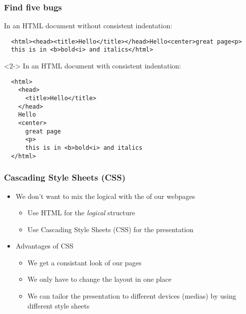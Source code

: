 \documentclass[dvipsnames,handout]{beamer}
\begin{document}
\begin{frame}[fragile]
\frametitle{Find five bugs}

In an HTML document without consistent indentation:
\begin{footnotesize}
\begin{verbatim}
  <html><head><title>Hello</title></head>Hello<center>great page<p>
  this is in <b>bold<i> and italics</html>
\end{verbatim}
\end{footnotesize}
\begin{uncoverenv}<2->
  In an HTML document with consistent indentation:
  \begin{footnotesize}
\begin{verbatim}
  <html>
    <head>
      <title>Hello</title>
    </head>
    Hello
    <center>
      great page
      <p>
      this is in <b>bold<i> and italics
  </html>
\end{verbatim}
   \end{footnotesize}
 \end{uncoverenv}
\end{frame}


\begin{frame}
  \frametitle{Cascading Style Sheets (CSS)}
  
  \begin{itemize}
  \item We don't want to mix the logical  with the
     of our webpages
    \begin{itemize}
    \item Use HTML for the \emph{logical} structure
    \item Use Cascading Style Sheets (CSS) for the presentation
    \end{itemize}
  \item Advantages of CSS
    \begin{itemize}
    \item We get a consistant look of our pages
    \item We only have to change the layout in one place
    \item We can tailor the presentation to different devices (medias)
      by using different style sheets
    \end{itemize}
\end{itemize}
  
\end{frame}
\end{document}
